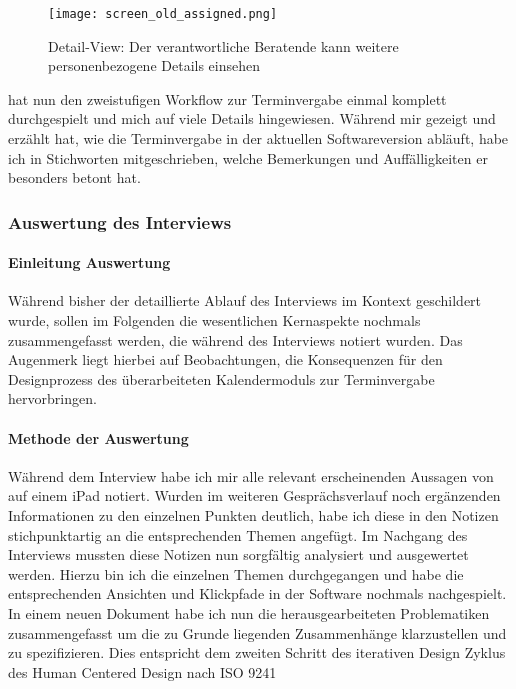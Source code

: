 \begin{figure}[h]
    \caption{Detail-View: Der verantwortliche Beratende kann weitere personenbezogene Details einsehen}
    \centering
    \texttt{[image: screen\_old\_assigned.png]}
\end{figure}

\ipName hat nun den zweistufigen Workflow zur Terminvergabe einmal komplett
durchgespielt und mich auf viele Details hingewiesen. Während \ipName mir
gezeigt und erzählt hat, wie die Terminvergabe in der aktuellen Softwareversion
abläuft, habe ich in Stichworten mitgeschrieben, welche Bemerkungen und
Auffälligkeiten er besonders betont hat.

\subsubsection{Auswertung des Interviews}

\paragraph{Einleitung Auswertung}
Während bisher der detaillierte Ablauf des Interviews im Kontext geschildert
wurde, sollen im Folgenden die wesentlichen Kernaspekte nochmals
zusammengefasst werden, die während des Interviews notiert wurden. Das
Augenmerk liegt hierbei auf Beobachtungen, die Konsequenzen für den
Designprozess des überarbeiteten Kalendermoduls zur Terminvergabe
hervorbringen.

\paragraph{Methode der Auswertung}
Während dem Interview habe ich mir alle relevant erscheinenden Aussagen von
\ipName auf einem iPad notiert. Wurden im weiteren Gesprächsverlauf noch
ergänzenden Informationen zu den einzelnen Punkten deutlich, habe ich diese in
den Notizen stichpunktartig an die entsprechenden Themen angefügt. Im Nachgang
des Interviews mussten diese Notizen nun sorgfältig analysiert und ausgewertet
werden. Hierzu bin ich die einzelnen Themen durchgegangen und habe die
entsprechenden Ansichten und Klickpfade in der Software nochmals nachgespielt.
In einem neuen Dokument habe ich nun die herausgearbeiteten Problematiken
zusammengefasst um die zu Grunde liegenden Zusammenhänge klarzustellen und zu
spezifizieren. Dies entspricht dem zweiten Schritt des iterativen Design Zyklus
des Human Centered Design nach ISO 9241 \cite{iso9241}

